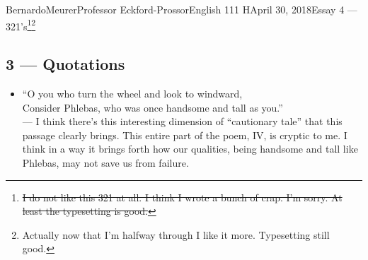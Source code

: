\documentclass[12pt,letterpaper]{article}
\begin{document}
\begin{mla}{Bernardo}{Meurer}{Professor Eckford-Prossor}{English 111 H}{April 30, 2018}{Essay 4 --- 321's\footnote{\st{I do not like this 321 at all. I think I wrote a bunch of crap. I'm sorry. At least the typesetting is good.}}\footnote{Actually now that I'm halfway through I like it more. Typesetting still good.}}
	\subsection*{3 --- Quotations}
	\begin{itemize}
		\item ``O you who turn the wheel and look to windward,\\ Consider Phlebas, who was once handsome and tall as you.''\\
		      --- I think there's this interesting dimension of ``cautionary tale'' that this passage clearly brings. This entire part of the poem, IV, is cryptic to me. I think in a way it brings forth how our qualities, being handsome and tall like Phlebas, may not save us from failure.


\end{itemize}
\end{mla}
\end{document}
